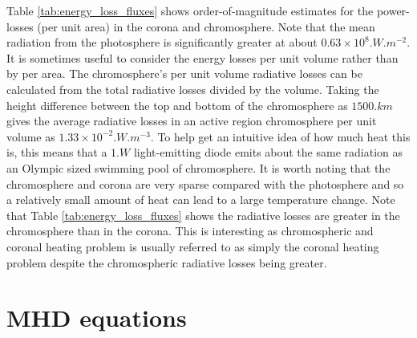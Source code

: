 Table \ref{tab:energy_loss_fluxes} shows order-of-magnitude estimates for the power-losses (per unit area) in the corona and chromosphere. Note that the mean radiation from the photosphere is significantly greater at about $0.63\times 10^8\si{.W.m^{-2}}$. It is sometimes useful to consider the energy losses per unit volume rather than by per area. The chromosphere’s per unit volume radiative losses can be calculated from the total radiative losses divided by the volume. 
Taking the height difference between the top and bottom of the chromosphere as $1500\si{.km}$ gives the average radiative losses in an active region chromosphere per unit volume as $1.33\times10^{-2}\si{.W.m^{-3}}$. To help get an intuitive idea of how much heat this is, this means that a $1\si{.W}$ light-emitting diode emits about the same radiation as an Olympic sized swimming pool of chromosphere. It is worth noting that the chromosphere and corona are very sparse compared with the photosphere and so a relatively small amount of heat can lead to a large temperature change.
Note that Table \ref{tab:energy_loss_fluxes} shows the radiative losses are greater in the chromosphere than in the corona. This is interesting as chromospheric and coronal heating problem is usually referred to as simply the coronal heating problem despite the chromospheric radiative losses being greater.

\section{MHD equations}
\label{sec:mhd equations}

